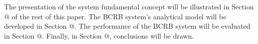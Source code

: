 \documentclass{IEEEtran}
\makeatletter
\newcommand{\Rmnum}[1]{\expandafter\@slowromancap\romannumeral #1@}
\makeatother
\begin{document}
\begin{itemize}
\end{itemize}

The presentation of the system fundamental concept will be illustrated in Section \Rmnum{2} of the rest of this paper. The BCRB system's analytical model will be developed in Section \Rmnum{3}. The performance of the BCRB system will be evaluated in Section \Rmnum{4}. Finally, in Section \Rmnum{5}, conclusions will be drawn.%
\end{document}

